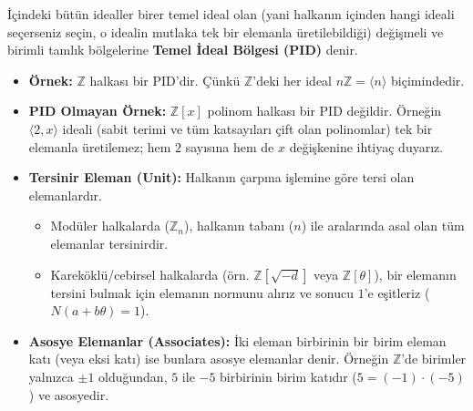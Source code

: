 \documentclass[11pt, a4paper]{article}
\begin{document}
\begin{konubox}[title=\faBook\enspace 7. PID (Temel İdeal Bölgesi)]
İçindeki bütün idealler birer temel ideal olan (yani halkanın içinden hangi ideali seçerseniz seçin, o idealin mutlaka tek bir elemanla üretilebildiği) değişmeli ve birimli tamlık bölgelerine \textbf{Temel İdeal Bölgesi (PID)} denir.
\begin{itemize}
    \item \textbf{Örnek:} $\mathbb{Z}$ halkası bir PID'dir. Çünkü $\mathbb{Z}$'deki her ideal $n\mathbb{Z} = \langle n \rangle$ biçimindedir.
    \item \textbf{PID Olmayan Örnek:} $\mathbb{Z}[x]$ polinom halkası bir PID değildir. Örneğin $\langle 2, x \rangle$ ideali (sabit terimi ve tüm katsayıları çift olan polinomlar) tek bir elemanla üretilemez; hem $2$ sayısına hem de $x$ değişkenine ihtiyaç duyarız.
\end{itemize}
\end{konubox}

\begin{konubox}[title=\faBook\enspace 8. Tersinir (Birim) ve Asosye (Birim Katı) Elemanlar]
\begin{itemize}
    \item \textbf{Tersinir Eleman (Unit):} Halkanın çarpma işlemine göre tersi olan elemanlardır. 
        \begin{itemize}
            \item Modüler halkalarda ($\mathbb{Z}_n$), halkanın tabanı ($n$) ile aralarında asal olan tüm elemanlar tersinirdir.
            \item Kareköklü/cebirsel halkalarda (örn. $\mathbb{Z}[\sqrt{-d}]$ veya $\mathbb{Z}[\theta]$), bir elemanın tersini bulmak için elemanın normunu alırız ve sonucu $1$'e eşitleriz ($N(a+b\theta) = 1$).
        \end{itemize}
    \item \textbf{Asosye Elemanlar (Associates):} İki eleman birbirinin bir birim eleman katı (veya eksi katı) ise bunlara asosye elemanlar denir. Örneğin $\mathbb{Z}$'de birimler yalnızca $\pm 1$ olduğundan, $5$ ile $-5$ birbirinin birim katıdır ($5 = (-1) \cdot (-5)$) ve asosyedir.
\end{itemize}
\end{konubox}
\end{document}
